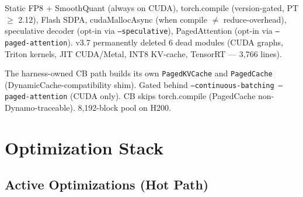 \documentclass[11pt,a4paper,twoside]{article}
\begin{document}
\begin{description}[nosep]
  \item[Stack A --- AR Backend] Static FP8 + SmoothQuant (always on CUDA),
        torch.compile (version-gated, PT $\geq$ 2.12), Flash SDPA,
        cudaMallocAsync (when compile $\neq$ reduce-overhead), speculative
        decoder (opt-in via \texttt{---speculative}), PagedAttention (opt-in
        via \texttt{---paged-attention}). v3.7 permanently deleted 6 dead
        modules (CUDA graphs, Triton kernels, JIT CUDA/Metal, INT8 KV-cache,
        TensorRT --- 3,766 lines).
  \item[Stack B --- ContinuousBatcher + PagedAttention] The harness-owned
        CB path builds its own \texttt{PagedKVCache} and \texttt{PagedCache}
        (DynamicCache-compatibility shim). Gated behind
        \texttt{---continuous-batching ---paged-attention} (CUDA only).
        CB skips torch.compile (PagedCache non-Dynamo-traceable).
        8,192-block pool on H200.
\end{description}

\section{Optimization Stack}

\subsection{Active Optimizations (Hot Path)}
\end{document}
